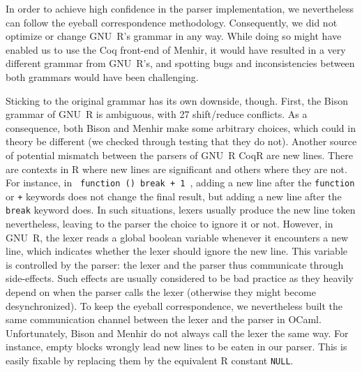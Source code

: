 \documentclass[
    sigplan,
    10pt,
    review, %
    natbib=false %
 ]{acmart}
\newcommand\mb[1]{\todo[color=purple!20,size=\scriptsize]{#1}}
\newcommand\mbi[1]{\todo[color=purple!20,inline]{#1}}
\newcommand\CoqR{CoqR}
\begin{document}
In order to achieve high confidence in the parser implementation, we nevertheless can follow the eyeball correspondence methodology.
Consequently, we did not optimize or change GNU~R's grammar in any way. While doing so might have enabled us to use the Coq front-end of Menhir, it would have resulted in a very different grammar from GNU~R's, and spotting bugs and inconsistencies between both grammars would have been challenging.

Sticking to the original grammar has its own downside, though. First, the Bison grammar of GNU~R is ambiguous, with 27 shift/reduce conflicts.
As a consequence, both Bison and Menhir make some arbitrary choices,
which could in theory be different (we checked through testing that they do not).
Another source of potential mismatch
between the parsers of GNU~R \CoqR{} are new lines.
There are contexts in R where new lines are significant
and others where they are not.
For instance, in \texttt{{ function () break + 1 }},
adding a new line after the \texttt{function} or \texttt{+} keywords does not change the final result,
but adding a new line after the \texttt{break} keyword does.
%
In such situations, lexers usually produce the new line token
nevertheless, leaving to the parser the choice to ignore it or not.
However, in GNU~R, the lexer reads a global boolean variable %
whenever it encounters a new line, which indicates whether the lexer should ignore the new line.
This variable is controlled by the parser:
the lexer and the parser thus communicate through side-effects.
%
Such effects are usually considered to be bad practice
as they heavily depend on when the parser calls the lexer
(otherwise they might become desynchronized).
%
To keep the eyeball correspondence,
we nevertheless built the same communication channel
between the lexer and the parser in OCaml.
Unfortunately, Bison and Menhir do not always call the lexer
the same way.
%
For instance, empty blocks \texttt{{}} wrongly
lead new lines to be eaten in our parser.
This is easily fixable by replacing them
by the equivalent R constant \texttt{NULL}.
\end{document}
